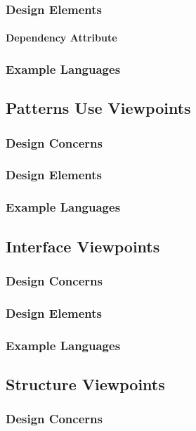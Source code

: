 \documentclass[letterpaper,10pt,titlepage,draftclsnofoot,onecolumn,onesided] {IEEEtran}
\begin{document}
\subsubsection{Design Elements}
\paragraph{Dependency Attribute}
\subsubsection{Example Languages}

\subsection{Patterns Use Viewpoints}
\subsubsection{Design Concerns}
\subsubsection{Design Elements}
\subsubsection{Example Languages}

\subsection{Interface Viewpoints}
\subsubsection{Design Concerns}
\subsubsection{Design Elements}
\subsubsection{Example Languages}

\subsection{Structure Viewpoints}
\subsubsection{Design Concerns}
\end{document}

